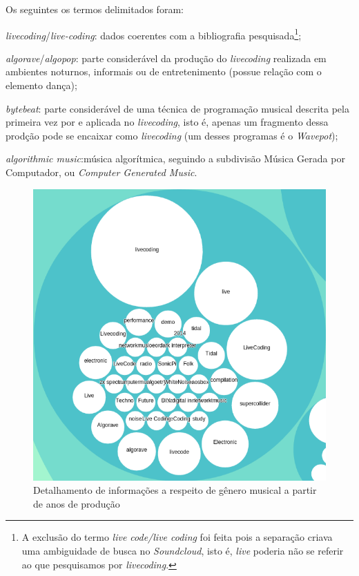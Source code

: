 Os seguintes os termos delimitados foram: \begin{inparaenum}
\item \emph{livecoding}/\emph{live-coding}: dados coerentes com a bibliografia pesquisada\footnote{A exclusão do termo \emph{live code/live coding} foi feita pois a separação criava uma ambiguidade de busca no \emph{Soundcloud}, isto é, \emph{live} poderia não se referir ao que pesquisamos por \emph{livecoding}.};
\item \emph{algorave}/\emph{algopop}: parte considerável da produção do \emph{livecoding} realizada em ambientes noturnos, informais ou de entretenimento (possue relação com o elemento dança);
\item \emph{bytebeat}: parte considerável de uma técnica de programação musical descrita pela primeira vez por  e aplicada no \emph{livecoding}, isto é, apenas um fragmento dessa prodção pode se encaixar como \emph{livecoding} (um desses programas é o \emph{Wavepot});
\item \emph{algorithmic music}:música algorítmica, seguindo a subdivisão Música Gerada por Computador, ou \emph{Computer Generated Music}\cite{cope_prefacio_2008}.
\end{inparaenum}

\begin{figure}[h]
\begin{center}
\includegraphics[scale=0.6]{./imagens/zoomable_circle_packing_genre_year_livecoding2.png}
\caption{Detalhamento de informações a respeito de gênero musical a partir de anos de produção}
\label{pacotao2}
\end{center}
\end{figure}

